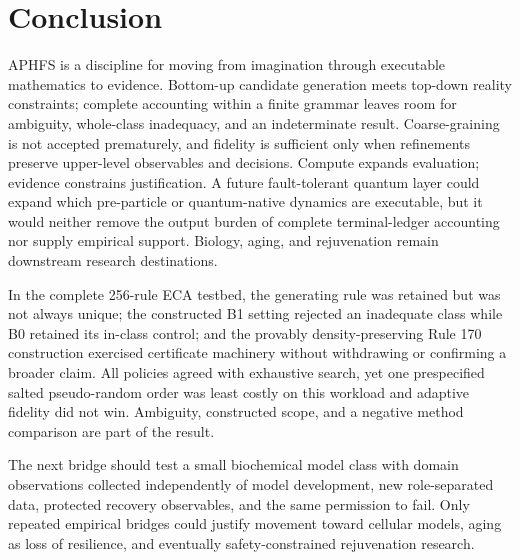 \documentclass[10pt]{article}
\theoremstyle{definition}
\begin{document}
\section{Conclusion}

APHFS is a discipline for moving from imagination through executable mathematics to evidence.
Bottom-up candidate generation meets top-down reality constraints; complete accounting within a
finite grammar leaves room for ambiguity, whole-class inadequacy, and an indeterminate result.
Coarse-graining is not accepted prematurely, and fidelity is sufficient only when refinements
preserve upper-level observables and decisions. Compute expands evaluation; evidence constrains
justification. A future fault-tolerant quantum layer could expand which pre-particle or
quantum-native dynamics are executable, but it would neither remove the output burden of complete
terminal-ledger accounting nor supply empirical support. Biology, aging, and rejuvenation remain
downstream research destinations.

In the complete 256-rule ECA testbed, the generating rule was retained but was not always unique;
the constructed B1 setting rejected an inadequate class while B0 retained its in-class control;
and the provably density-preserving Rule 170 construction exercised certificate machinery without
withdrawing or confirming a broader claim. All policies agreed with exhaustive search, yet one
prespecified salted pseudo-random order was least costly on this workload and adaptive fidelity did
not win. Ambiguity, constructed scope, and a negative method comparison are part of the result.

The next bridge should test a small biochemical model class with domain observations collected
independently of model development, new role-separated data, protected recovery observables, and
the same permission to fail. Only repeated empirical bridges could justify movement toward
cellular models, aging as loss of resilience, and eventually safety-constrained rejuvenation
research.

\clearpage
\appendix




\end{document}
